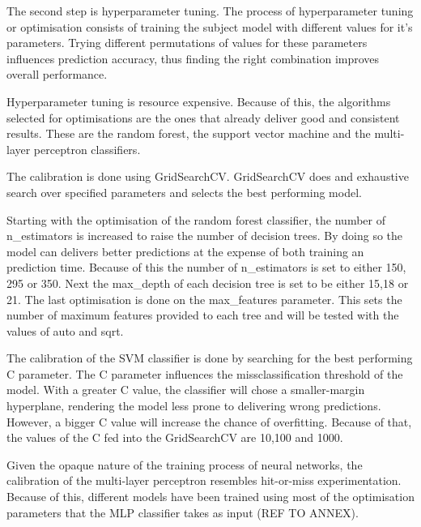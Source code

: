 The second step is hyperparameter tuning. The process of hyperparameter tuning or optimisation consists of training the subject model with different values for it's parameters. Trying different permutations of values for these parameters influences prediction accuracy, thus finding the right combination improves overall performance.

Hyperparameter tuning is resource expensive. Because of this, the algorithms selected for optimisations are the ones that already deliver good and consistent results. These are the random forest, the support vector machine and the multi-layer perceptron classifiers.

The calibration is done using GridSearchCV. GridSearchCV does and exhaustive search over specified parameters and selects the best performing model.

Starting with the optimisation of the random forest classifier, the number of n\_estimators is increased to raise the number of decision trees. By doing so the model can delivers better predictions at the expense of both training an prediction time. Because of this the number of n\_estimators is set to either 150, 295 or 350. Next the max\_depth of each decision tree is set to be either 15,18 or 21. The last optimisation is done on the max\_features parameter. This sets the number of maximum features provided to each tree and will be tested with the values of auto and sqrt.

The calibration of the SVM classifier is done by searching for the best performing C parameter. The C parameter influences the missclassification threshold of the model. With a greater C value, the classifier will chose a smaller-margin hyperplane, rendering the model less prone to delivering wrong predictions. However, a bigger C value will increase the chance of overfitting. Because of that, the values of the C fed into the GridSearchCV are 10,100 and 1000.

Given the opaque nature of the training process of neural networks, the calibration of the multi-layer perceptron resembles hit-or-miss experimentation. Because of this, different models have been trained using most of the optimisation parameters that the MLP classifier takes as input (REF TO ANNEX).

